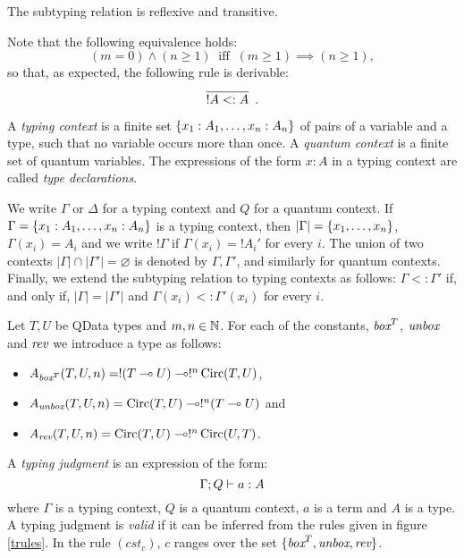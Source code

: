 \documentclass[twoside]{article}
\begin{document}
\begin{proposition}
The subtyping relation is reflexive and transitive.
\end{proposition}

Note that the following equivalence holds: 
\[
(m=0)\wedge (n\geq 1) 
~\mbox{ iff }~ 
(m\geq 1) \implies (n\geq 1),
\]
so that, as expected, the following rule is derivable:
\[
  \infer[]{!A <: A}{}
  .
\]

\begin{definition}
A \emph{typing context} is a finite set 
$\{x_1:A_1,\ldots,x_n:A_n\}$ of pairs of a variable and 
a type, such that no variable occurs more than once. A 
\emph{quantum context} is a finite set of quantum variables. 
The expressions of the form $x:A$ in a typing context are 
called \emph{type declarations}.	
\end{definition}

We write $\Gamma$ or $\Delta$ for a typing context and $Q$ for 
a quantum context. If $\Gamma =\{x_1:A_1,\ldots,x_n:A_n\}$ is 
a typing context, then $|\Gamma|=\{x_1,\ldots,x_n\}$, 
$\Gamma (x_i)=A_i$ and we write $!\Gamma$ if $\Gamma(x_i)=!A_i'$ 
for every $i$. The union of two contexts 
$|\Gamma|\cap  |\Gamma'|=\varnothing$ is denoted by $\Gamma,\Gamma'$, 
and similarly for quantum contexts. Finally, we extend the subtyping 
relation to typing contexts as follows: $\Gamma <: \Gamma'$ if, and 
only if, $|\Gamma | = |\Gamma'|$ and $\Gamma (x_i)<: \Gamma' (x_i)$ 
for every $i$.

\begin{definition}
Let $T,U$ be QData types and $m,n\in\mathbb{N}$. For each of the constants, 
$\mathop{\textit{box}}\nolimits^T$, $\mathop{\textit{unbox}}\nolimits$ and $\mathop{\textit{rev}}\nolimits$ we introduce a type as follows:
\begin{itemize}
  \item $A_{\mathop{\textit{box}}\nolimits^T}(T,U,n)=!(T\multimap U)\multimap !^n\mathop{\textrm{Circ}}\nolimits(T,U)$,
  \item $A_{\mathop{\textit{unbox}}\nolimits}(T,U,n)=\mathop{\textrm{Circ}}\nolimits(T,U)\multimap !^n(T\multimap U)$ and
  \item $A_{\mathop{\textit{rev}}\nolimits}(T,U,n)=\mathop{\textrm{Circ}}\nolimits(T,U) \multimap !^n\mathop{\textrm{Circ}}\nolimits(U,T)$.
\end{itemize}
\end{definition}

\begin{definition}
A \emph{typing judgment} is an expression of the form:
\[
\Gamma ; Q \vdash a:A
\] 
where $\Gamma$ is a typing context, $Q$ is a quantum context, 
$a$ is a term and $A$ is a type. A typing judgment is \emph{valid} if 
it can be inferred from the rules given in figure 
\hyperref[trules]{\ref*{trules}}. In the rule $(cst_c)$, 
$c$ ranges over the set $\{\mathop{\textit{box}}\nolimits^T, \mathop{\textit{unbox}}\nolimits, \mathop{\textit{rev}}\nolimits\}$.
\end{definition}
\end{document}
